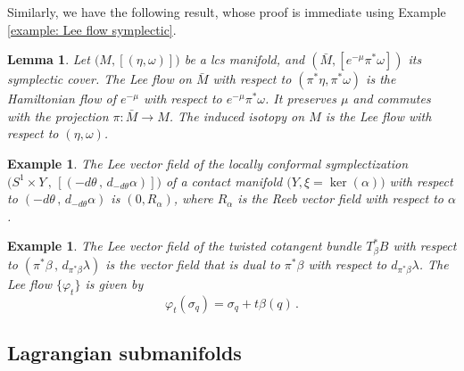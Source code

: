 \documentclass{amsart}
\newtheorem{lemma}[thm]{Lemma}
\newtheorem{example}[thm]{Example}
\theoremstyle{remark}
\begin{document}
Similarly,
we have the following result,
whose proof is immediate
using Example \ref{example: Lee flow symplectic}.

\begin{lemma}\label{lemma: Lee flow symplectic cover}
Let $\big( M , [(\eta, \omega)] \big)$ be a lcs manifold,
and $(\bar{M}, [e^{-\mu} \pi^{\ast}\omega])$
its symplectic cover.
The Lee flow on $\bar{M}$ with respect to $(\pi^*\eta, \pi^*\omega)$
is the Hamiltonian flow of $e^{-\mu}$
with respect to $e^{-\mu}\pi^{\ast}\omega$.
It preserves $\mu$ and commutes with the projection $\pi: \bar{M} \rightarrow M$.
The induced isotopy on $M$
is the Lee flow with respect to $(\eta, \omega)$.
\end{lemma}

\begin{example}
The Lee vector field of the locally conformal symplectization
$\big( S^1 \times Y \,,\, [(- d\theta \,,\, d_{-d\theta}\alpha)]\big)$
of a contact manifold $\big(Y, \xi = \ker (\alpha)\big)$
with respect to $(- d\theta \,,\, d_{-d\theta}\alpha)$
is $(0, R_{\alpha})$,
where $R_{\alpha}$ is the Reeb vector field
with respect to $\alpha$.
\end{example}

\begin{example}\label{example: Lee flow on twisted cotangent bundle}
The Lee vector field of the twisted cotangent bundle $T^{\ast}_{\beta}B$
with respect to $(\pi^{\ast}\beta \,,\, d_{\pi^{\ast}\beta} \lambda)$
is the vector field that is dual to $\pi^{\ast}\beta$
with respect to $d_{\pi^{\ast}\beta} \lambda$.
The Lee flow $\{\varphi_t\}$ is given by
$$
\varphi_t (\sigma_q) = \sigma_q + t \beta (q) \,.
$$
\end{example}


\subsection{Lagrangian submanifolds}
\end{document}
